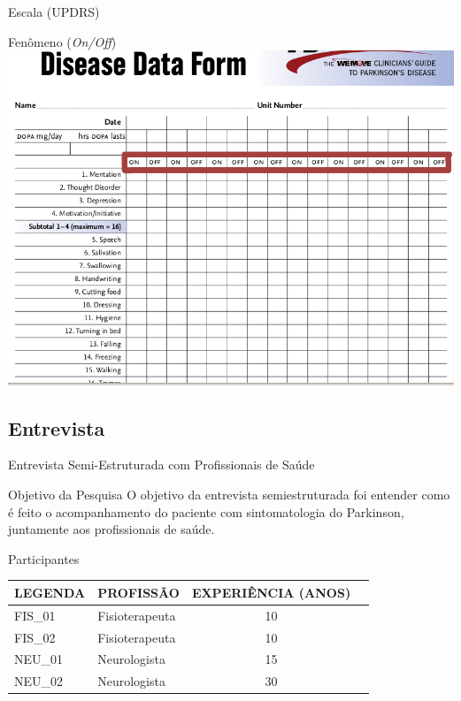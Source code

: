 \documentclass{beamer}
\begin{document}
\begin{frame}{Escala (UPDRS)} 
    \begin{block}{Fenômeno (\textit{On/Off})}
      \center \includegraphics[height=2.4 in]{img/updr1-sel.png}
    \end{block}		
\end{frame}



\subsection{Entrevista}
\begin{frame}{Entrevista Semi-Estruturada com Profissionais de Saúde} 
    \begin{block}{Objetivo da Pesquisa}
    O objetivo da entrevista semiestruturada foi entender como é feito o acompanhamento do paciente com sintomatologia do Parkinson, juntamente aos profissionais de saúde.
    \end{block}
		\begin{block}{Participantes}
			\begin{table}[h]
			\begin{tabular}{|l|l|c|c|}
			\hline
			\textbf{LEGENDA} & \textbf{PROFISSÃO}             & \multicolumn{1}{|l|}{\textbf{EXPERIÊNCIA (ANOS)}} \\ \hline
			FIS\_01          & Fisioterapeuta & 10                                                \\ \hline
			FIS\_02          & Fisioterapeuta    & 10                                                \\ \hline
			NEU\_01          & Neurologista            & 15                                                \\ \hline
			NEU\_02          & Neurologista            & 30                                                \\ \hline
			\end{tabular}
			\end{table}
    \end{block}
\end{frame} 
\end{document}
